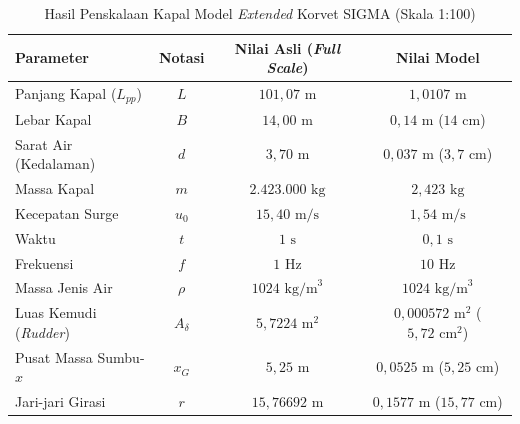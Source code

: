 \documentclass{article}
\begin{document}
\begin{table}[H]
\centering
\small
\caption{Hasil Penskalaan Kapal Model \textit{Extended} Korvet SIGMA (Skala 1:100)}
\label{tab:hasil_penskalaan_100}
\begin{tabular}{lccc}
\toprule
\textbf{Parameter} & \textbf{Notasi} & \textbf{Nilai Asli (\textit{Full Scale})} & \textbf{Nilai Model} \\
\midrule
Panjang Kapal ($L_{pp}$) & $L$ & $101{,}07\text{ m}$ & $1{,}0107\text{ m}$ \\
Lebar Kapal & $B$ & $14{,}00\text{ m}$ & $0{,}14\text{ m}$ ($14\text{ cm}$) \\
Sarat Air (Kedalaman) & $d$ & $3{,}70\text{ m}$ & $0{,}037\text{ m}$ ($3{,}7\text{ cm}$) \\
Massa Kapal & $m$ & $2.423.000\text{ kg}$ & $2{,}423\text{ kg}$ \\
Kecepatan Surge & $u_0$ & $15{,}40\text{ m/s}$ & $1{,}54\text{ m/s}$ \\
Waktu & $t$ & $1\text{ s}$ & $0{,}1\text{ s}$ \\
Frekuensi & $f$ & $1\text{ Hz}$ & $10\text{ Hz}$ \\
Massa Jenis Air & $\rho$ & $1024\text{ kg/m}^3$ & $1024\text{ kg/m}^3$ \\
Luas Kemudi (\textit{Rudder}) & $A_\delta$ & $5{,}7224\text{ m}^2$ & $0{,}000572\text{ m}^2$ ($5{,}72\text{ cm}^2$) \\
Pusat Massa Sumbu-$x$ & $x_G$ & $5{,}25\text{ m}$ & $0{,}0525\text{ m}$ ($5{,}25\text{ cm}$) \\
Jari-jari Girasi & $r$ & $15{,}76692\text{ m}$ & $0{,}1577\text{ m}$ ($15{,}77\text{ cm}$) \\
\bottomrule
\end{tabular}
\end{table}
\end{document}
